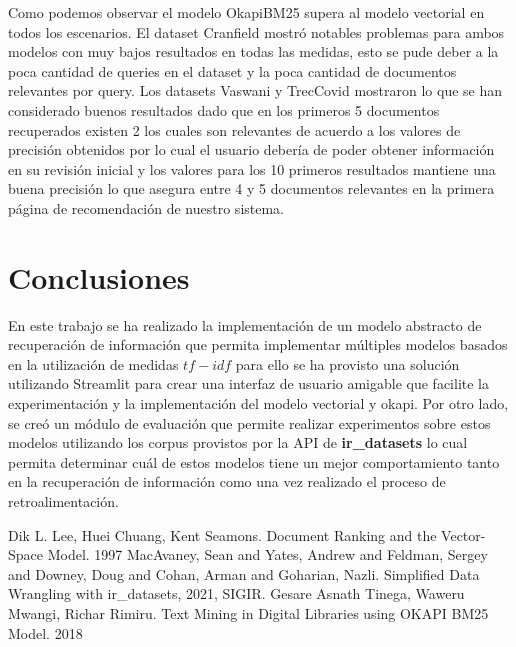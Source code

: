\documentclass[a4paper,10pt,twocolumn]{article}
\begin{document}
        Como podemos observar el modelo OkapiBM25 supera al modelo vectorial en todos los escenarios. El dataset 
        Cranfield mostr\'o notables problemas para ambos modelos con muy bajos resultados en todas las medidas, esto se pude
        deber a la poca cantidad de queries en el dataset y la poca cantidad de documentos relevantes por query. Los datasets 
        Vaswani y TrecCovid mostraron lo que se han considerado buenos resultados dado que en los primeros 5 documentos recuperados
        existen 2 los cuales son relevantes de acuerdo a los valores de precisi\'on obtenidos por lo cual el usuario deber\'ia de poder
        obtener informaci\'on en su revisi\'on inicial y los valores para los 10 primeros resultados mantiene una buena precisi\'on lo que asegura
        entre 4 y 5 documentos relevantes en la primera p\'agina de recomendaci\'on de nuestro sistema.


\section{Conclusiones}\label{sec:conc}

	En este trabajo se ha realizado la implementaci\'on de un modelo abstracto de recuperaci\'on 
	de informaci\'on que permita implementar m\'ultiples modelos basados en la utilizaci\'on de medidas 
	$tf-idf$ para ello se ha provisto una soluci\'on utilizando Streamlit para crear una interfaz de usuario 
	amigable que facilite la experimentación y la implementaci\'on del modelo vectorial y okapi.
	Por otro lado, se creó un módulo de evaluaci\'on que permite realizar experimentos sobre estos modelos utilizando
	los corpus provistos por la API de \textbf{ir\_datasets} lo cual permita determinar cu\'al de estos modelos tiene un mejor comportamiento
	tanto en la recuperación de información como una vez realizado el proceso de retroalimentación.



\begin{thebibliography}{99}
	 Dik L. Lee, Huei Chuang, Kent Seamons. Document Ranking and the Vector-Space Model. 1997
	 MacAvaney, Sean and Yates, Andrew and Feldman, Sergey and Downey, Doug and Cohan, Arman and Goharian, Nazli.
	Simplified Data Wrangling with ir\_datasets, 2021, SIGIR.
	 Gesare Asnath Tinega, Waweru Mwangi, Richar Rimiru. Text Mining in Digital Libraries using OKAPI BM25 Model. 2018
\end{thebibliography}


\label{end}
\end{document}
